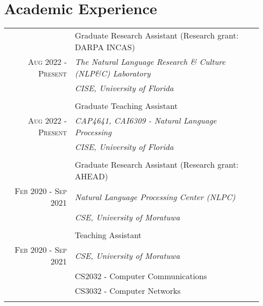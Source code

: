 \documentclass[a4paper,11pt]{article}
\begin{document}
\section{Academic Experience}
\begin{tabular}{r|p{15cm}}
 \emph{} & Graduate Research Assistant (Research grant: DARPA INCAS) \textsc{}  \\\textsc{Aug 2022 - Present}&\emph{The Natural Language Research \& Culture (NLP\&C) Laboratory} \\ &\emph{CISE, University of Florida} \\\multicolumn{2}{c}{} \\
 



\emph{} & Graduate Teaching Assistant \textsc{}  \\\textsc{Aug 2022 - Present}&\emph{CAP4641, CAI6309 - Natural Language Processing} \textsc{} \\\textsc{}&\emph{CISE, University of Florida} \\\multicolumn{2}{c}{} \\

 \emph{} & Graduate Research Assistant (Research grant: AHEAD) \textsc{}  \\\textsc{Feb 2020 - Sep 2021}&\emph{Natural Language Processing Center (NLPC)} \\ &\emph{CSE, University of Moratuwa}\\\multicolumn{2}{c}{} \\
 
 \emph{} & Teaching Assistant\\\textsc{Feb 2020 - Sep 2021}  &\emph{CSE, University of Moratuwa}\\ &\footnotesize{CS2032 - Computer Communications}\\ &\footnotesize{CS3032 - Computer Networks}\\\multicolumn{2}{c}{} \\
 
  
\end{tabular}
\end{document}
